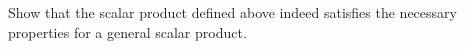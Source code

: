 \documentclass{memoir}
\begin{document}
\begin{hw}
	Show that the scalar product defined above indeed satisfies the necessary properties for a general scalar product.
\end{hw}


%
%     
%
%
\end{document}
